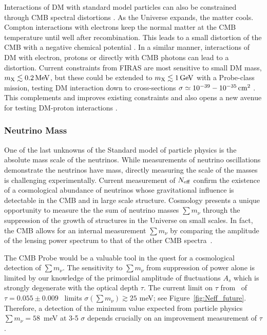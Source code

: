 Interactions of DM with standard model particles can also be constrained through CMB spectral distortions \citep{Yacine2015DM}. As the Universe expands, the matter cools. Compton interactions with electrons keep the normal matter at the CMB temperature until well after recombination. This leads to a small distortion of the CMB with a negative chemical potential \citep{Chluba2011therm}. In a similar manner, interactions of DM with electron, protons or directly with CMB photons can lead to a distortion. Current constraints from FIRAS are most sensitive to small DM mass, $m_{\rm X}\lesssim 0.2\,{\rm MeV}$, but these could be extended to $m_{\rm X}\lesssim 1\,{\rm GeV}$ with a Probe-class mission, testing DM interaction down to cross-sections $\sigma\simeq 10^{-39}-10^{-35}\,{\rm cm}^2$ \citep{Yacine2015DM}. This complements and improves existing constraints \citep{Essig2012PhRvL.109b1301E, Boehm2014MNRAS.445L..31B} and also opens a new avenue for testing DM-proton interactions \citep{Yacine2015DM}.

\vspace{-0.15in}

\subsubsection{Neutrino Mass}

\vspace{-0.05in}

One of the last unknowns of the Standard model of particle physics is the absolute mass scale of the neutrinos.  While measurements of neutrino oscillations demonstrate the neutrinos have mass, directly measuring the scale of the masses is challenging experimentally.  Current measurement of ${N_{\rm eff}}$ confirm the existence of a cosmological abundance of neutrinos whose gravitational influence is detectable in the CMB and in large scale structure.  Cosmology presents a unique opportunity to measure the the sum of neutrino masses $\sum m_\nu$ through the suppression of the growth of structures in the Universe on small scales.  In fact, the CMB allows for an internal measurement $\sum m_\nu$ by comparing the amplitude of the lensing power spectrum to that of the other CMB spectra~\cite{Kaplinghat:2003bh}.


The \ac{CMB} Probe would be a valuable tool in the quest for a cosmological detection of $\sum m_\nu$.   The sensitivity to $\sum m_\nu$ from suppression of power alone is limited by our knowledge of 
the primordial amplitude of fluctuations $A_s$ which is strongly degenerate with the optical depth $\tau$.  The current limit on $\tau$ from \planck\ of 
$\tau = 0.055 \pm 0.009$~\cite{} limits 
$\sigma(\sum m_\nu) \gtrsim 25$ meV; see Figure~\ref{fig:Neff_future}.  
Therefore, a detection of the minimum value expected from particle physics  
$\sum m_\nu = 58$~meV at 3-5 $\sigma$ depends crucially on an improvement measurement of $\tau$.  

